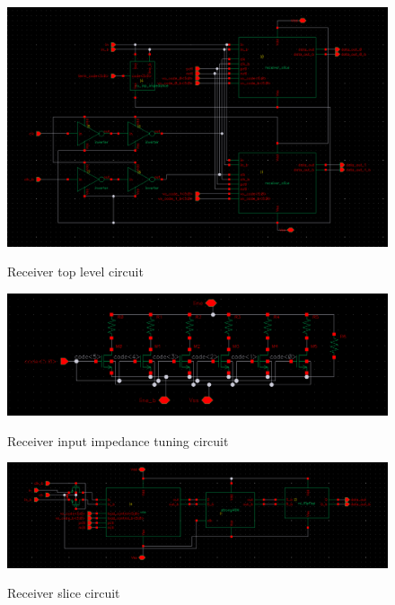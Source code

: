 \begin{figure}[H]
  \centering
  {\includegraphics[scale=0.4]{schematics/receiver.png}}
  \caption{Receiver top level circuit}
  \label{fig:top_level}
\end{figure}

\begin{figure}[H]
  \centering
  {\includegraphics[scale=0.4]{schematics/rx_inp_impedance.png}}
  \caption{Receiver input impedance tuning circuit}
  \label{fig:imp_tuning}
\end{figure}

\begin{figure}[H]
  \centering
  {\includegraphics[scale=0.4]{schematics/receiver_slice.png}}
  \caption{Receiver slice circuit}
  \label{fig:receiver_slice}
\end{figure}


